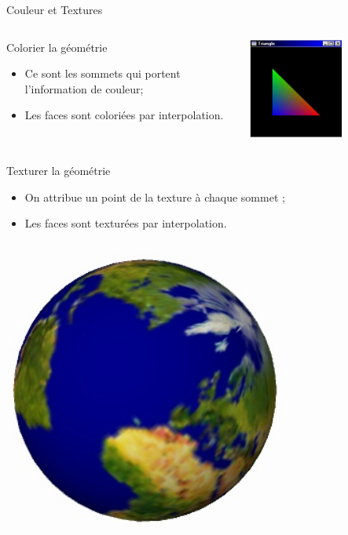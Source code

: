 \documentclass{beamer}
\begin{document}
\begin{frame}{Couleur et Textures}
	\begin{columns}
		\begin{column}{0.65\textwidth}
			\begin{block}{Colorier la géométrie}
				\begin{itemize}
					\item Ce sont les sommets qui portent l'information de couleur;
					\item Les faces sont coloriées par interpolation.
				\end{itemize}
			\end{block}
		\end{column}
		\begin{column}{0.3\textwidth}
			\centering
			\includegraphics[width=0.6\textwidth]{img/triang}
		\end{column}
	\end{columns}
	\pause
	\begin{block}{Texturer la géométrie}
		\begin{itemize}
			\item On attribue un point de la texture à chaque sommet ;
			\item Les faces sont texturées par interpolation.
		\end{itemize}
	\end{block}
	\begin{columns}
		\begin{column}{0.4\textwidth}
			\centering
			\includegraphics[width=0.7\textwidth]{img/model_earth}

\end{column}
\end{columns}
\end{frame}
\end{document}
